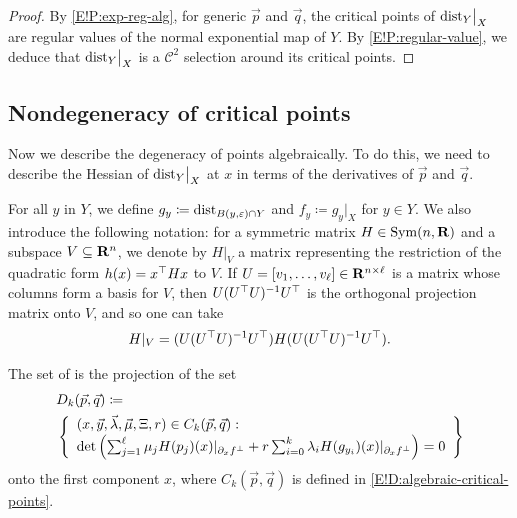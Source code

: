 \begin{proof}
  By \cref{E!P:exp-reg-alg}, for generic $\vec{p}$ and $\vec{q}$, the critical points of $\mathord{\operatorname{dist}}_Y\big|_X$ are regular values of the normal exponential map of $Y$. By \cref{E!P:regular-value}, we deduce that $\mathord{\operatorname{dist}}_Y\big|_X$ is a $\mathcal{C}^2$ selection around its critical points.
\end{proof}

\subsection{Nondegeneracy of critical points}

Now we describe the degeneracy of points algebraically. To do this, we need to describe the Hessian of $\mathord{\operatorname{dist}}_Y\big|_X$ at $x$ in terms of the derivatives of $\vec{p}$ and $\vec{q}$.

For all $y$ in $Y$, we define $g_y \coloneq \operatorname{dist}_{B(y, \varepsilon) \cap Y}$ and $f_y \coloneq g_y |_X$ for $y \in Y$.
We also introduce the following notation: for a symmetric matrix $H \in \operatorname{Sym}(n, \mathbf{R})$ and a subspace $V \subseteq \mathbf{R}^n$, we denote by $H|_V$ a matrix representing the restriction of the quadratic form $h(x)=x^\top Hx$ to $V$. If $U = [v_1, \ldots, v_\ell] \in \mathbf{R}^{n \times \ell}$ is a matrix whose columns form a basis for $V$, then $U (U^\top U)^{-1} U^\top$ is the orthogonal projection matrix onto $V$, and so one can take
\[
  H|_{V} = (U (U^\top U)^{-1} U^\top) H (U (U^\top U)^{-1} U^\top).
\]

\begin{definition}
  The set of  is the projection of the set
  \begin{align}
  \label{E!E:alg-degenerate}
    & D_k(\vec{p}, \vec{q}) \coloneq \\
    & \left\{
    \begin{array}{l}
      (x, \vec{y}, \vec{\lambda}, \vec{\mu}, \Xi, r) \in C_k(\vec{p}, \vec{q}) \vphantom{\sum_{j = 1}^\ell} : \\
      \det \left( \sum_{j = 1}^\ell \mu_j H(p_j)(x)|_{\partial_x f^\bot} + r \sum_{i = 0}^k \lambda_i H(g_{y_i})(x)|_{\partial_x f^\bot} \right) = 0
    \end{array}
    \right\}
  \end{align}
  onto the first component $x$, where $C_k(\vec{p}, \vec{q})$ is defined in \cref{E!D:algebraic-critical-points}.
\end{definition}

